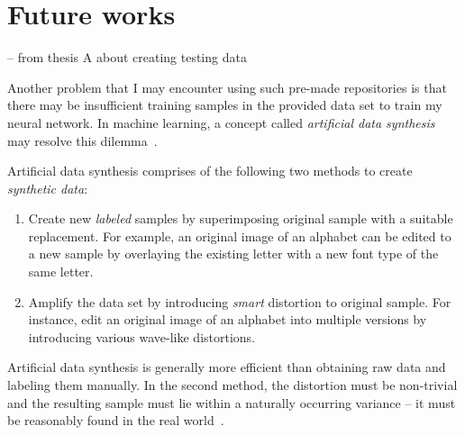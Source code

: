 \section{Future works} \label{se:eval.future}



-- from thesis A about creating testing data

Another problem that I may encounter using such pre-made repositories is that there may be insufficient training samples in the provided data set to train my neural network. In machine learning, a concept called \textit{artificial data synthesis} may resolve this dilemma~\cite{Ng12}. 

Artificial data synthesis comprises of the following two methods to create \textit{synthetic data}: 
\begin{enumerate}
\item Create new \textit{labeled} samples by superimposing original sample with a suitable replacement. For example, an original image of an alphabet can be edited to a new sample by overlaying the existing letter with a new font type of the same letter.
\item Amplify the data set by introducing \textit{smart} distortion to original sample. For instance, edit an original image of an alphabet into multiple versions by introducing various wave-like distortions.
\end{enumerate}

Artificial data synthesis is generally more efficient than obtaining raw data and labeling them manually. In the second method, the distortion must be non-trivial and the resulting sample must lie within a naturally occurring variance -- it must be reasonably found in the real world~\cite{Ng12}.

